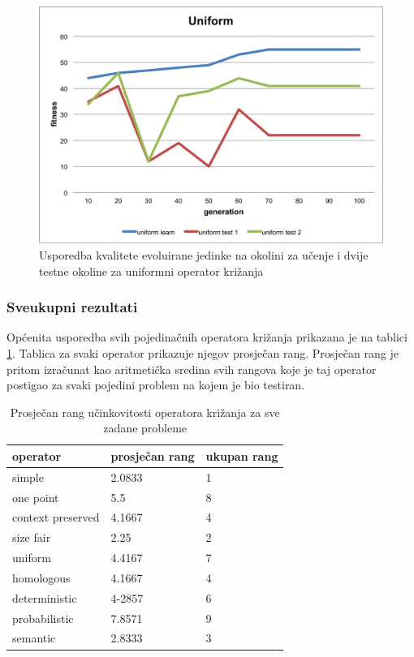 \begin{figure}[H]
	\centering
	\includegraphics[scale=0.8]{./slike/cross-validation/uniform.png}
	\caption{Usporedba kvalitete evoluirane jedinke na okolini za učenje i dvije testne okoline za uniformni operator križanja}
	\label{uniform}
\end{figure}


\subsubsection{Sveukupni rezultati}
Općenita usporedba svih pojedinačnih operatora križanja prikazana je na tablici \ref{overAllTable}. Tablica za svaki operator prikazuje njegov prosječan rang. Prosječan rang je pritom izračunat kao aritmetička sredina svih rangova koje je taj operator postigao za svaki pojedini problem na kojem je bio testiran.

\begin{table}[H]
 	\centering
 \caption{Prosječan rang učinkovitosti operatora križanja za sve zadane probleme}
 
    \begin{tabular}{| l | l | l |}
    \hline
   \textbf{operator} & \textbf{prosječan rang} & \textbf{ukupan rang} \\ \hline
   simple & 2.0833 & 1\\ \hline
   one point & 5.5 & 8\\ \hline
   context preserved & 4.1667 & 4 \\ \hline
   size fair & 2.25 & 2\\ \hline
   uniform & 4.4167 & 7\\ \hline
   homologous & 4.1667 & 4\\ \hline
   deterministic & 4-2857 & 6\\ \hline
   probabilistic & 7.8571 & 9\\ \hline
   semantic & 2.8333 & 3\\ \hline

 
    \end{tabular}
    
   
    \label{overAllTable}
\end{table}

